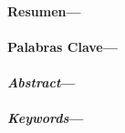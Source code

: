 \newpage
\setcounter{page}{2}
\
\vfill
\vfill
\begin{flushright}
\end{flushright}
\begin{flushright}
\noindent \dedicatoria
\end{flushright}
\vfill
\newpage
\begin{center}
\end{center}
\noindent \agradecimientos
\vfill
\newpage
{}
\vspace{0.3cm}
\noindent \textbf{Resumen---}\resumen \ \\
\vspace{0.3cm} \\
\noindent \textbf{Palabras Clave---}\palabrasclave \ \\
\vspace{1.2cm} \\
\vspace{0.3cm}
\noindent \textbf{\emph{Abstract}---}\resumeningles \ \\
\vspace{0.3cm} \\
\noindent \textbf{\emph{Keywords}---}\palabrasclaveingles \ \\
